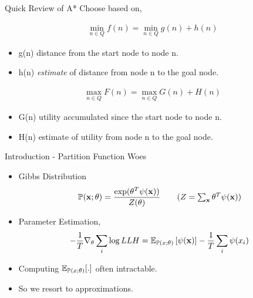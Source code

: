 \begin{frame}{Quick Review of A*}
  Choose based on,
  \begin{overprint}
    \begin{align*}
      \min_{n \in Q} f(n) = \min_{n \in Q} g(n) + h(n)
    \end{align*}
    \begin{itemize}
    \item g(n) distance from the start node to node n.
    \item h(n) \emph{estimate} of distance from node n to the goal node.
    \end{itemize}
    \begin{align*}
      \max_{n \in Q} F(n) = \max_{n \in Q} G(n) + H(n)
    \end{align*}
    \begin{itemize}
    \item G(n) utility accumulated since the start node to node n.
    \item H(n) estimate of utility from node n to the goal node.
    \end{itemize}
  \end{overprint}
\end{frame}
\begin{frame}{Introduction - Partition Function Woes}
  \begin{itemize}[<+->]
  \item Gibbs Distribution
    \begin{align*}
      \Pr(\x;\theta) =\frac{\exp(\theta^T\psi(\x))}{Z(\theta)} \tag{$Z=\sum_{\x} \theta^T\psi(\x)$}
    \end{align*}
  \item Parameter Estimation,
    \begin{align*}
      - \frac{1}{T}\nabla_\theta \sum_i\log LLH = \operatorname{\mathbb{E}}_{\mathbb{P}(x;\theta)}\left[\psi(\operatorname{\mathbf{x}})\right] - \frac{1}{T} \sum_i\psi(x_i)
    \end{align*}
  \item Computing $\operatorname{\mathbb{E}}_{\mathbb{P}(x;\theta)}[.]$ often intractable.
  \item So we resort to approximations.
  \end{itemize}
\end{frame}
